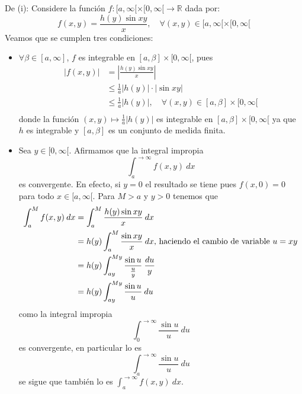 \documentclass[12pt]{report}
\theoremstyle{largebreak}
\renewcommand{\leq}{\ensuremath{\leqslant}}
\newcommand\abs[1]{\ensuremath{\left|#1\right|}}
\newcommand\cf[3]{\ensuremath{#1:#2\rightarrow#3}}
\begin{document}
    \begin{sol}
        De (i): Considere la función $\cf{f}{[a,\infty[\times[0,\infty[}{\mathbb{R}}$ dada por:
        \begin{equation*}
            f(x,y)=\frac{h(y)\sin xy}{x},\quad\forall (x,y)\in[a,\infty[\times[0,\infty[
        \end{equation*}
        Veamos que se cumplen tres condiciones:
        \begin{itemize}
            \item $\forall \beta\in[a,\infty]$, $f$ es integrable en $[a,\beta]\times[0,\infty[$, pues
            \begin{equation*}
                \begin{split}
                    \abs{f(x,y)}&=\abs{\frac{h(y)\sin xy}{x}}\\
                    &\leq\frac{1}{a}\abs{h(y)}\cdot\abs{\sin xy}\\
                    &\leq\frac{1}{a}\abs{h(y)},\quad\forall (x,y)\in[a,\beta]\times[0,\infty[\\
                \end{split}
            \end{equation*}
            donde la función $(x,y)\mapsto\frac{1}{a}\abs{h(y)}$ es integrable en $[a,\beta]\times[0,\infty[$ ya que $h$ es integrable y $[a,\beta]$ es un conjunto de medida finita.

            \item Sea $y\in[0,\infty[$. Afirmamos que la integral impropia
            \begin{equation*}
                \int_a^{ \rightarrow\infty}f(x,y)\:dx
            \end{equation*}
            es convergente. En efecto, si $y=0$ el resultado se tiene pues $f(x,0)=0$ para todo $x\in[a,\infty[$. Para $M>a$ y $y>0$ tenemos que
            \begin{equation*}
                \begin{split}
                    \int_a^{M}f(x,y)\:dx&=\int_a^{M}\frac{h(y)\sin xy}{x}\:dx\\
                    &=h(y)\int_{a}^{M}\frac{\sin xy}{x}\:dx\textup{, haciendo el cambio de variable }u=xy\\
                    &=h(y)\int_{ ay}^{ My}\frac{\sin u}{\frac{u}{y}}\:\frac{du}{y}\\
                    &=h(y)\int_{ ay}^{ My}\frac{\sin u}{u}\:du\\
                \end{split}
            \end{equation*}
            como la integral impropia
            \begin{equation*}
                \int_{ 0}^{ \rightarrow\infty}\frac{\sin u}{u}\:du
            \end{equation*}
            es convergente, en particular lo es
            \begin{equation*}
                \int_{a}^{ \rightarrow\infty}\frac{\sin u}{u}\:du
            \end{equation*}
            se sigue que también lo es $\int_a^{\rightarrow\infty}f(x,y)\:dx$.


\end{itemize}
\end{sol}
\end{document}
